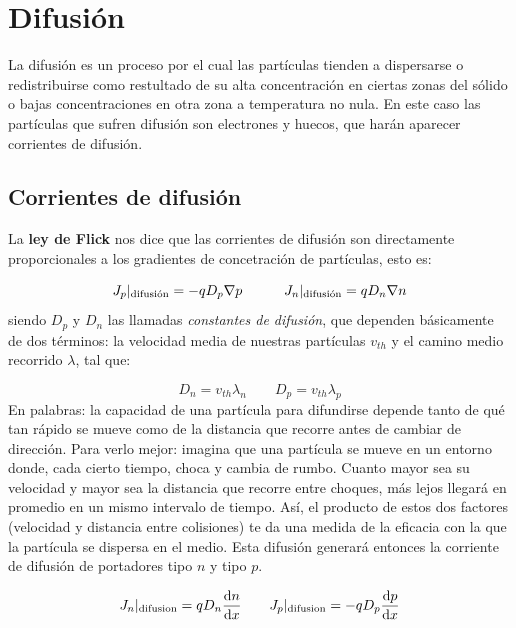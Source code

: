 \section{Difusión}

La difusión es un proceso por el cual las partículas tienden a dispersarse o redistribuirse como restultado de su alta concentración en ciertas zonas del sólido o bajas concentraciones en otra zona a temperatura no nula. En este caso las partículas que sufren difusión son electrones y huecos, que harán aparecer corrientes de difusión.

\subsection{Corrientes de difusión}

La \textbf{ley de Flick} nos dice que las corrientes de difusión son directamente proporcionales a los gradientes de concetración de partículas, esto es:

\begin{equation}
	J_p|_{\text{difusión}} = -qD_p\nabla p \quad \quad \quad
	J_n|_{\text{difusión}} =  qD_n\nabla n
\end{equation}
siendo $D_p$ y $D_n$ las llamadas \textit{constantes de difusión}, que dependen básicamente de dos términos: la velocidad media de nuestras partículas $v_{th}$ y el camino medio recorrido $\lambda$, tal que:

\begin{equation}
	D_n = v_{th} \lambda_{n} \qquad D_p = v_{th} \lambda_{p}
\end{equation}
En palabras: la capacidad de una partícula para difundirse depende tanto de qué tan rápido se mueve como de la distancia que recorre antes de cambiar de dirección. Para verlo mejor: imagina que una partícula se mueve en un entorno donde, cada cierto tiempo, choca y cambia de rumbo. Cuanto mayor sea su velocidad y mayor sea la distancia que recorre entre choques, más lejos llegará en promedio en un mismo intervalo de tiempo. Así, el producto de estos dos factores (velocidad y distancia entre colisiones) te da una medida de la eficacia con la que la partícula se dispersa en el medio. Esta difusión generará entonces la corriente de difusión de portadores tipo $n$ y tipo $p$.

\begin{equation}
	J_n |_{\text{difusion}} = qD_n \frac{\mathrm{d} n}{\mathrm{d} x} \qquad
	J_p |_{\text{difusion}} = -qD_p \frac{\mathrm{d} p}{\mathrm{d} x}
\end{equation}

